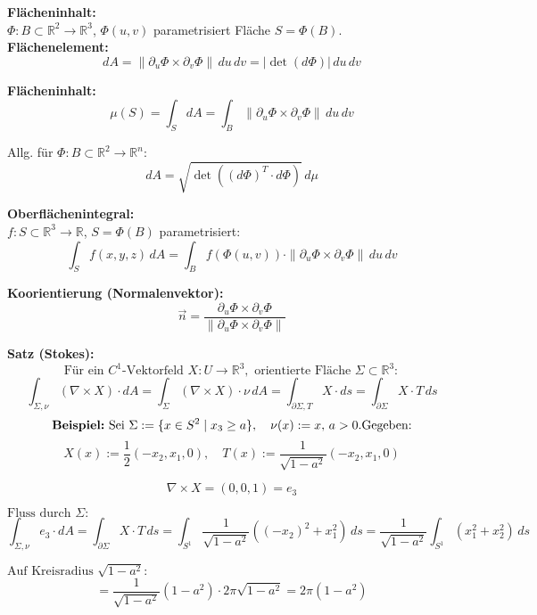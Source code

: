 \textbf{Flächeninhalt:} \\
$\Phi : B \subset \mathbb{R}^2 \to \mathbb{R}^3$, $\Phi(u,v)$ parametrisiert Fläche $S = \Phi(B)$. \\
\textbf{Flächenelement:}
\[
dA = \|\partial_u \Phi \times \partial_v \Phi\| \, du\,dv = |\det(d\Phi)| \, du\,dv
\]

\textbf{Flächeninhalt:}
\[
\mu(S) = \int_S dA = \int_B \|\partial_u \Phi \times \partial_v \Phi\| \, du\,dv
\]

Allg. für $\Phi: B \subset \mathbb{R}^2 \to \mathbb{R}^n$:
\[
dA = \sqrt{\det((d\Phi)^T \cdot d\Phi)} \, d\mu
\]

\vspace{1em}

\textbf{Oberflächenintegral:} \\
$f : S \subset \mathbb{R}^3 \to \mathbb{R}$, $S = \Phi(B)$ parametrisiert:
\[
\int_S f(x,y,z)\, dA = \int_B f(\Phi(u,v)) \cdot \|\partial_u \Phi \times \partial_v \Phi\| \, du\,dv
\]

\vspace{1em}

\textbf{Koorientierung (Normalenvektor):}
\[
\vec{n} = \frac{\partial_u \Phi \times \partial_v \Phi}{\|\partial_u \Phi \times \partial_v \Phi\|}
\]



\textbf{Satz (Stokes):} \\
\[
\text{Für ein } C^1\text{-Vektorfeld } X : U \to \mathbb{R}^3, \text{ orientierte Fläche } \Sigma \subset \mathbb{R}^3: 
\]
\[
\int_{\Sigma, \nu} (\nabla \times X) \cdot dA 
= \int_{\Sigma} (\nabla \times X) \cdot \nu \, dA 
= \int_{\partial \Sigma, T} X \cdot ds 
= \int_{\partial \Sigma} X \cdot T \, ds
\]
\[
\textbf{Beispiel:} \text{ Sei } \Sigma := \{x \in S^2 \mid x_3 \geq a \}, \quad \nu(x) := x, \, a > 0. \\
\text{Gegeben:}
\]
\[
X(x) := \frac{1}{2}(-x_2, x_1, 0), \quad T(x) := \frac{1}{\sqrt{1 - a^2}}(-x_2, x_1, 0)
\]

\[
\nabla \times X = (0, 0, 1) = e_3
\]

$\text{Fluss durch } \Sigma: $
\[
\int_{\Sigma, \nu} e_3 \cdot dA 
= \int_{\partial \Sigma} X \cdot T \, ds 
= \int_{S^1} \frac{1}{\sqrt{1-a^2}} ((-x_2)^2 + x_1^2) \, ds 
= \frac{1}{\sqrt{1 - a^2}} \int_{S^1} (x_1^2 + x_2^2) \, ds
\]

$\text{Auf Kreisradius } \sqrt{1 - a^2}: $
\[
= \frac{1}{\sqrt{1 - a^2}} (1 - a^2) \cdot 2\pi\sqrt{1 - a^2}
= 2\pi (1 - a^2)
\]

